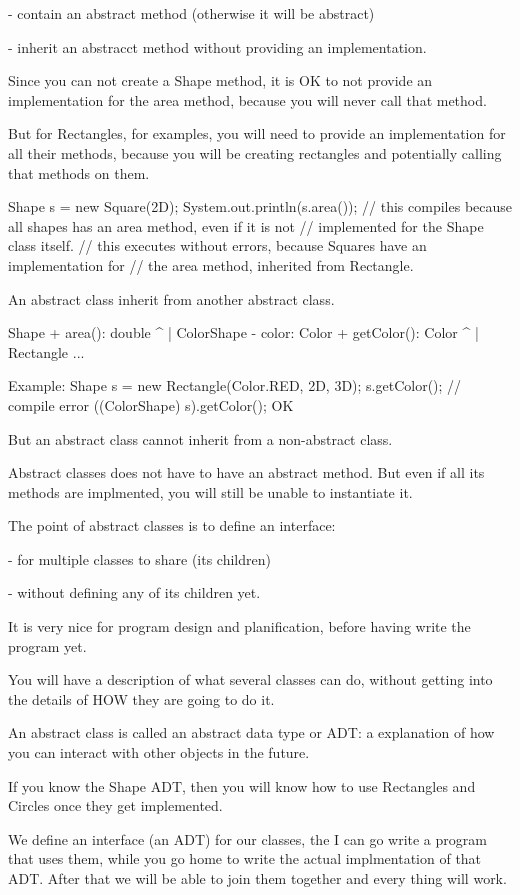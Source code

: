 \documentclass[a4paper, 9pt]{extarticle}
\begin{document}
\begin{blackboard}
 - contain an abstract method (otherwise it will be abstract)

 - inherit an abstracct method without providing an implementation.

Since you can not create a Shape method, it is OK to not provide an
implementation for the area method, because you will never call that method.

But for Rectangles, for examples, you will need to provide an implementation
for all their methods, because you will be creating rectangles and potentially
calling that methods on them.

Shape s = new Square(2D);
System.out.println(s.area());
// this compiles because all shapes has an area method, even if it is not
// implemented for the Shape class itself.
// this executes without errors, because Squares have an implementation for
// the area method, inherited from Rectangle.

An abstract class inherit from another abstract class.

Shape
+ area(): double
  ^
  |
ColorShape
- color: Color
+ getColor(): Color
  ^
  |
Rectangle ...

Example:
Shape s = new Rectangle(Color.RED, 2D, 3D);
s.getColor(); // compile error
((ColorShape) s).getColor(); OK

But an abstract class cannot inherit from a non-abstract class.

Abstract classes does not have to have an abstract method. But even if all its
methods are implmented, you will still be unable to instantiate it.

The point of abstract classes is to define an interface:

- for multiple classes to share (its children)

- without defining any of its children yet.

It is very nice for program design and planification, before having write the
program yet.

You will have a description of what several classes can do, without getting
into the details of HOW they are going to do it.

An abstract class is called an abstract data type or ADT: a explanation of how
you can interact with other objects in the future.

If you know the Shape ADT, then you will know how to use Rectangles and
Circles once they get implemented.

We define an interface (an ADT) for our classes, the I can go write a program
that uses them, while you go home to write the actual implmentation of that
ADT. After that we will be able to join them together and every thing will
work.


\end{blackboard}
\end{document}
